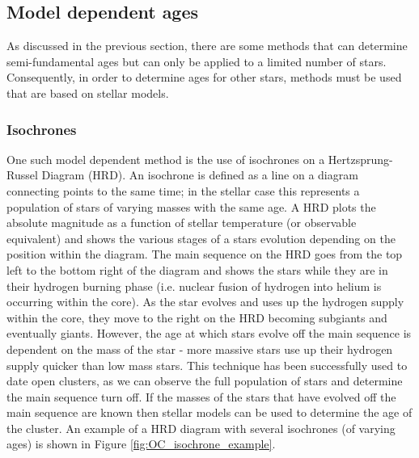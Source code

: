 \subsection{Model dependent ages}
As discussed in the previous section, there are some methods that can determine semi-fundamental ages but can only be applied to a limited number of stars. Consequently, in order to determine ages for other stars, methods must be used that are based on stellar models.

\subsubsection{Isochrones}
One such model dependent method is the use of isochrones on a Hertzsprung-Russel Diagram (HRD). An isochrone is defined as a line on a diagram connecting points to the same time; in the stellar case this represents a population of stars of varying masses with the same age. A HRD plots the absolute magnitude as a function of stellar temperature (or observable equivalent) and shows the various stages of a stars evolution depending on the position within the diagram. The main sequence on the HRD goes from the top left to the bottom right of the diagram and shows the stars while they are in their hydrogen burning phase (i.e. nuclear fusion of hydrogen into helium is occurring within the core). As the star evolves and uses up the hydrogen supply within the core, they move to the right on the HRD becoming subgiants and eventually giants. However, the age at which stars evolve off the main sequence is dependent on the mass of the star - more massive stars use up their hydrogen supply quicker than low mass stars. This technique has been successfully used to date open clusters, as we can observe the full population of stars and determine the main sequence turn off. If the masses of the stars that have evolved off the main sequence are known then stellar models can be used to determine the age of the cluster. An example of a HRD diagram with several isochrones (of varying ages) is shown in Figure \ref{fig:OC_isochrone_example}.

